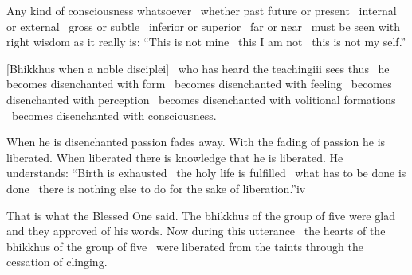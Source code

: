 Any kind of consciousness whatsoever \breathmark\ whether past future or present \breathmark\ internal or external \breathmark\ gross or subtle \breathmark\ inferior or superior \breathmark\ far or near \breathmark\ must be seen with right wisdom as it really is: ``This is not mine \breathmark\ this I am not \breathmark\ this is not my self.''

[Bhikkhus when a noble disciplei] \breathmark\ who has heard the teachingiii sees thus \breathmark\ he becomes disenchanted with form \breathmark\ becomes disenchanted with feeling \breathmark\ becomes disenchanted with perception \breathmark\ becomes disenchanted with volitional formations \breathmark\ becomes disenchanted with consciousness.



When he is disenchanted passion fades away. With the fading of passion he is liberated. When liberated there is knowledge that he is liberated. He understands: ``Birth is exhausted \breathmark\ the holy life is fulfilled \breathmark\ what has to be done is done \breathmark\ there is nothing else to do for the sake of liberation.''iv


That is what the Blessed One said. The bhikkhus of the group of five were glad and they approved of his words. Now during this utterance \breathmark\ the hearts of the bhikkhus of the group of five \breathmark\ were liberated from the taints through the cessation of clinging.

\suttaRef{[SN 22.59]}

